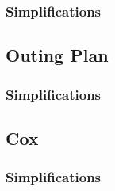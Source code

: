 \subsubsection{Simplifications}
\begin{itemize}
  
\end{itemize}

\subsection{Outing Plan}
\subsubsection{Simplifications}
\begin{itemize}
  
\end{itemize}

\subsection{Cox}

\subsubsection{Simplifications}
\begin{itemize}
  
\end{itemize}
